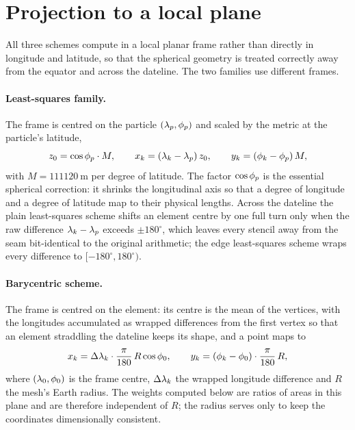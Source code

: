 \section{Projection to a local plane}\label{sec:hvel-projection}

All three schemes compute in a local planar frame rather than directly in longitude and latitude, so
that the spherical geometry is treated correctly away from the equator and across the dateline. The
two families use different frames.

\paragraph{Least-squares family.} The frame is centred on the particle $(\lambda_p,\phi_p)$ and scaled
by the metric at the particle's latitude,
\begin{equation}\label{eq:hvel-projection}
  z_0 = \cos\phi_p\cdot M, \qquad
  x_k = (\lambda_k-\lambda_p)\,z_0, \qquad
  y_k = (\phi_k-\phi_p)\,M ,
\end{equation}
with $M=\SI{111120}{\metre}$ per degree of latitude. The factor $\cos\phi_p$ is the essential
spherical correction: it shrinks the longitudinal axis so that a degree of longitude and a degree of
latitude map to their physical lengths. Across the dateline the plain least-squares scheme shifts an
element centre by one full turn only when the raw difference $\lambda_k-\lambda_p$ exceeds $\pm180^\circ$,
which leaves every stencil away from the seam bit-identical to the original arithmetic; the edge
least-squares scheme wraps every difference to $[-180^\circ,180^\circ)$.

\paragraph{Barycentric scheme.} The frame is centred on the element: its centre is the mean of the
vertices, with the longitudes accumulated as wrapped differences from the first vertex so that an
element straddling the dateline keeps its shape, and a point maps to
\begin{equation}\label{eq:hvel-projection-bary}
  x_k = \Delta\lambda_k \cdot \frac{\pi}{180}\, R \cos\phi_0, \qquad
  y_k = (\phi_k-\phi_0)\cdot \frac{\pi}{180}\, R ,
\end{equation}
where $(\lambda_0,\phi_0)$ is the frame centre, $\Delta\lambda_k$ the wrapped longitude difference and
$R$ the mesh's Earth radius. The weights computed below are ratios of areas in this plane and are
therefore independent of $R$; the radius serves only to keep the coordinates dimensionally
consistent.

